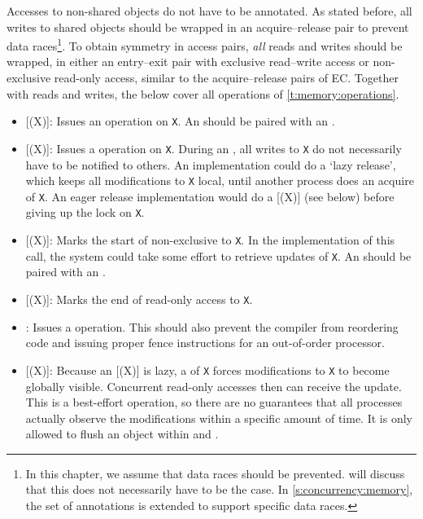 Accesses to non-shared objects do not have to be annotated.
As stated before, all writes to shared objects should be wrapped in an acquire--release pair to prevent data races\footnote{%
	In this chapter, we assume that data races should be prevented.
	 will discuss that this does not necessarily have to be the case.
	In \cref{s:concurrency:memory}, the set of annotations is extended to support specific data races.}.
To obtain symmetry in access pairs, \emph{all} reads and writes should be wrapped, in either an entry--exit pair with exclusive read--write access or non-exclusive read-only access, similar to the acquire--release pairs of \ac{EC}.
Together with reads and writes, the  below cover all operations of \vref{t:memory:operations}.
\begin{itemize}
\item {}[(X)]:
	Issues an  operation on \lstinline|X|.
	An  should be paired with an .
\item {}[(X)]:
	Issues a  operation on \lstinline|X|.
	During an , all writes to \lstinline|X| do not necessarily have to be notified to others.
	An implementation could do a `lazy release', which keeps all modifications to \lstinline|X| local, until another process does an acquire of \lstinline|X|.
	An eager release implementation would do a [(X)] (see below) before giving up the lock on \lstinline|X|.
\item {}[(X)]:
	Marks the start of non-exclusive  to \lstinline|X|.
	In the implementation of this call, the system could take some effort to retrieve updates of \lstinline|X|.
	An  should be paired with an .
\item {}[(X)]:
	Marks the end of read-only access to \lstinline|X|.
\item {}:
	Issues a  operation.
	This should also prevent the compiler from reordering code and issuing proper fence instructions for an out-of-order processor.
\item {}[(X)]:
	Because an [(X)] is lazy, a  of \lstinline|X| forces modifications to \lstinline|X| to become globally visible.
	Concurrent read-only accesses then can receive the update.
	This is a best-effort operation, so there are no guarantees that all processes actually observe the modifications within a specific amount of time.
	It is only allowed to flush an object within  and .
\end{itemize}

